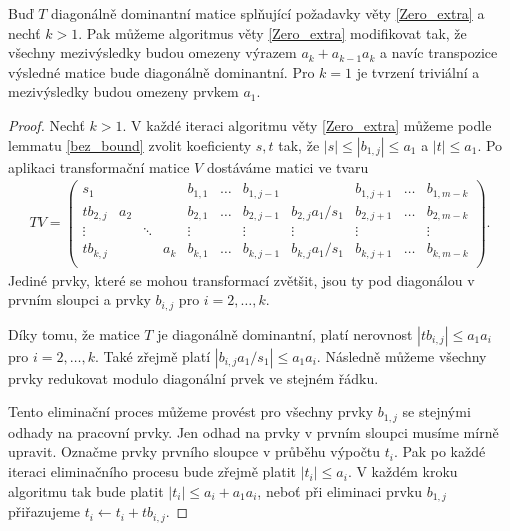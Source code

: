 \begin{lem} \label{Zero_extra_modified}
Buď $ T $ diagonálně dominantní matice splňující požadavky věty \ref{Zero_extra} 
a nechť $ k > 1 $.
Pak můžeme algoritmus věty \ref{Zero_extra} modifikovat tak, že všechny
mezivýsledky budou omezeny výrazem $ a_k + a_{k - 1} a_k $ 
a navíc transpozice výsledné matice bude diagonálně dominantní.
Pro $ k = 1 $ je tvrzení triviální a mezivýsledky budou omezeny prvkem $ a_1 $.
\end{lem}
\begin{proof}
Nechť $ k > 1 $. V každé iteraci algoritmu věty \ref{Zero_extra} můžeme podle lemmatu
\ref{bez_bound} zvolit koeficienty $ s, t $ tak, že $ |s| \leq |b_{1,j}| \leq a_1$
a $ |t| \leq a_1 $. Po aplikaci transformační matice $ V $ dostáváme matici ve
tvaru
\begin{align*}
TV =
    \left(
    \begin{array}{cccc|ccccccc}
        s_1      &     &        &     & b_{1,1} & \hdots & b_{1,j-1} &                   & b_{1,j+1} & \hdots & b_{1,m-k} \\
        tb_{2,j} & a_2 &        &     & b_{2,1} & \hdots & b_{2,j-1} & b_{2,j} a_1 / s_1 & b_{2,j+1} & \hdots & b_{2,m-k} \\
        \vdots   &     & \ddots &     & \vdots  &        & \vdots    & \vdots            & \vdots    &        & \vdots    \\
        tb_{k,j} &     &        & a_k & b_{k,1} & \hdots & b_{k,j-1} & b_{k,j} a_1 / s_1 & b_{k,j+1} & \hdots & b_{k,m-k} \\
    \end{array}
    \right).
\end{align*}
Jediné prvky, které se mohou transformací zvětšit, jsou ty pod diagonálou v 
prvním sloupci a prvky $ b_{i,j} $ pro $ i = 2,\dots,k $.

Díky tomu, že matice $ T $ je diagonálně dominantní, platí nerovnost
$ |tb_{i,j}| \leq a_1 a_i $ pro $ i = 2,\dots,k $. Také zřejmě platí
$ | b_{i,j} a_1 / s_1 | \leq a_1 a_i $. Následně můžeme všechny prvky redukovat
modulo diagonální prvek ve stejném řádku.

Tento eliminační proces můžeme provést pro všechny prvky $ b_{1, j} $ se stejnými
odhady na pracovní prvky. Jen odhad na prvky v prvním sloupci musíme mírně upravit.
Označme prvky prvního sloupce v průběhu výpočtu $ t_i $. Pak po každé iteraci
eliminačního procesu bude zřejmě platit $ |t_i| \leq a_i $. V každém kroku
algoritmu tak bude platit $ |t_i| \leq a_i + a_1 a_i $, neboť při eliminaci
prvku $ b_{1,j} $ přiřazujeme $ t_i \leftarrow t_i + tb_{i,j} $.


\end{proof}

